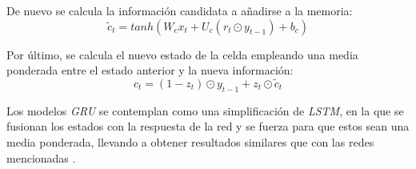 De nuevo se calcula la información candidata a añadirse a la memoria:
\begin{equation}
    \widetilde{c}_t = tanh(W_c x_t + U_c (r_t \odot y_{t-1}) + b_c)
\end{equation}

Por último, se calcula el nuevo estado de la celda empleando una media ponderada
entre el estado anterior y la nueva información:
\begin{equation}
    c_t = (1 - z_t) \odot y_{t-1} + z_t \odot \widetilde{c}_t
\end{equation}

Los modelos \textit{GRU} se contemplan como una simplificación de \textit{LSTM},
en la que se fusionan los estados con la respuesta de la red y se fuerza para que estos
sean una media ponderada, llevando a obtener resultados similares que con las redes
mencionadas \cite{book:rue2019}.


